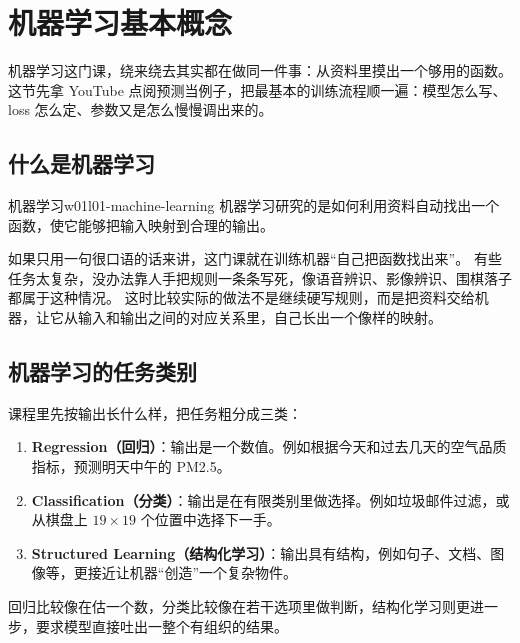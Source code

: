 \documentclass[main.tex]{subfiles}
\begin{document}
\chapter{机器学习基本概念}
\label{chap:w01l01-ml-intro}

\begin{keypointbox}
机器学习这门课，绕来绕去其实都在做同一件事：从资料里摸出一个够用的函数。
这节先拿 YouTube 点阅预测当例子，把最基本的训练流程顺一遍：模型怎么写、loss 怎么定、参数又是怎么慢慢调出来的。
\end{keypointbox}

\section{什么是机器学习}
\label{sec:w01l01-what-is-ml}

\begin{definition}{机器学习}{w01l01-machine-learning}
机器学习研究的是如何利用资料自动找出一个函数，使它能够把输入映射到合理的输出。
\end{definition}

如果只用一句很口语的话来讲，这门课就在训练机器“自己把函数找出来”。
有些任务太复杂，没办法靠人手把规则一条条写死，像语音辨识、影像辨识、围棋落子都属于这种情况。
这时比较实际的做法不是继续硬写规则，而是把资料交给机器，让它从输入和输出之间的对应关系里，自己长出一个像样的映射。

\section{机器学习的任务类别}
\label{sec:w01l01-task-types}

课程里先按输出长什么样，把任务粗分成三类：
\begin{enumerate}
  \item \textbf{Regression（回归）}：输出是一个数值。例如根据今天和过去几天的空气品质指标，预测明天中午的 PM2.5。
  \item \textbf{Classification（分类）}：输出是在有限类别里做选择。例如垃圾邮件过滤，或从棋盘上 $19 \times 19$ 个位置中选择下一手。
  \item \textbf{Structured Learning（结构化学习）}：输出具有结构，例如句子、文档、图像等，更接近让机器“创造”一个复杂物件。
\end{enumerate}

\begin{examplebox}
回归比较像在估一个数，分类比较像在若干选项里做判断，结构化学习则更进一步，要求模型直接吐出一整个有组织的结果。
\end{examplebox}
\end{document}
